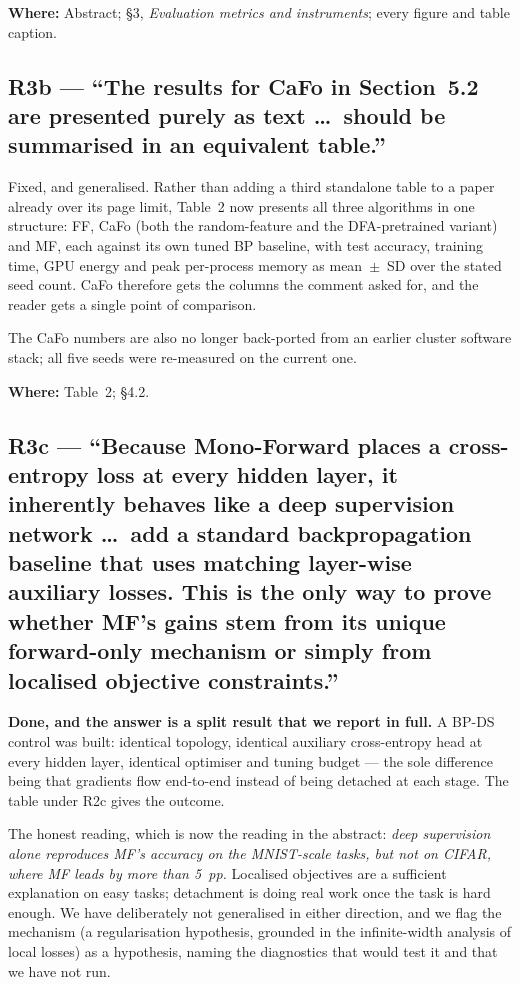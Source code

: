\documentclass[11pt,a4paper]{article}
\newcommand{\FF}{FF}
\newcommand{\MF}{MF}
\newcommand{\BP}{BP}
\newcommand{\CaFo}{CaFo}
\newcommand{\BPDS}{BP-DS}
\newcommand{\where}[1]{\par\smallskip\noindent\textbf{Where:} #1\par}
\begin{document}
\where{Abstract; \S3, \emph{Evaluation metrics and instruments}; every figure
and table caption.}

\subsection*{R3b --- ``The results for CaFo in Section~5.2 are presented purely
as text \dots\ should be summarised in an equivalent table.''}

Fixed, and generalised. Rather than adding a third standalone table to a paper
already over its page limit, Table~2 now presents all three algorithms in one
structure: \FF{}, \CaFo{} (both the random-feature and the DFA-pretrained
variant) and \MF{}, each against its own tuned \BP{} baseline, with test
accuracy, training time, GPU energy and peak per-process memory as
mean~$\pm$~SD over the stated seed count. \CaFo{} therefore gets the columns
the comment asked for, and the reader gets a single point of comparison.

The \CaFo{} numbers are also no longer back-ported from an earlier cluster
software stack; all five seeds were re-measured on the current one.

\where{Table~2; \S4.2.}

\subsection*{R3c --- ``Because Mono-Forward places a cross-entropy loss at
every hidden layer, it inherently behaves like a deep supervision network
\dots\ add a standard backpropagation baseline that uses matching layer-wise
auxiliary losses. This is the only way to prove whether MF's gains stem from
its unique forward-only mechanism or simply from localised objective
constraints.''}

\textbf{Done, and the answer is a split result that we report in full.} A
\BPDS{} control was built: identical topology, identical auxiliary
cross-entropy head at every hidden layer, identical optimiser and tuning
budget --- the sole difference being that gradients flow end-to-end instead of
being detached at each stage. The table under R2c gives the outcome.

The honest reading, which is now the reading in the abstract: \emph{deep
supervision alone reproduces \MF{}'s accuracy on the MNIST-scale tasks, but
not on CIFAR, where \MF{} leads by more than \num{5}~pp.} Localised objectives
are a sufficient explanation on easy tasks; detachment is doing real work once
the task is hard enough. We have deliberately not generalised in either
direction, and we flag the mechanism (a regularisation hypothesis, grounded in
the infinite-width analysis of local losses) as a hypothesis, naming the
diagnostics that would test it and that we have not run.
\end{document}

